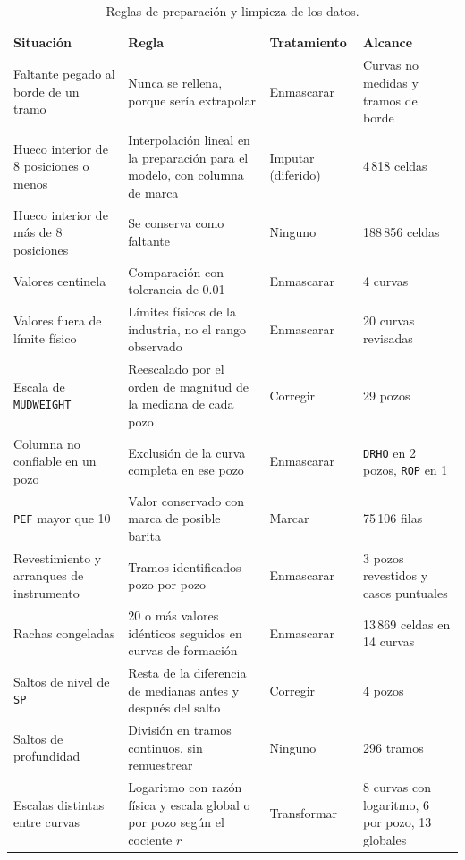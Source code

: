 \documentclass[11pt,a4paper]{article}
\begin{document}
\begin{table}[htbp]
\centering
\small
\caption{Reglas de preparación y limpieza de los datos.}
\label{tab:limpieza}
\begin{tabular}{p{3.4cm}p{4.9cm}p{2.2cm}p{3.3cm}}
\toprule
\textbf{Situación} & \textbf{Regla} & \textbf{Tratamiento} & \textbf{Alcance} \\
\midrule
Faltante pegado al borde de un tramo & Nunca se rellena, porque sería extrapolar & Enmascarar & Curvas no medidas y tramos de borde \\
Hueco interior de 8 posiciones o menos & Interpolación lineal en la preparación para el modelo, con columna de marca & Imputar (diferido) & 4\,818 celdas \\
Hueco interior de más de 8 posiciones & Se conserva como faltante & Ninguno & 188\,856 celdas \\
Valores centinela & Comparación con tolerancia de 0.01 & Enmascarar & 4 curvas \\
Valores fuera de límite físico & Límites físicos de la industria, no el rango observado & Enmascarar & 20 curvas revisadas \\
Escala de \texttt{MUDWEIGHT} & Reescalado por el orden de magnitud de la mediana de cada pozo & Corregir & 29 pozos \\
Columna no confiable en un pozo & Exclusión de la curva completa en ese pozo & Enmascarar & \texttt{DRHO} en 2 pozos, \texttt{ROP} en 1 \\
\texttt{PEF} mayor que 10 & Valor conservado con marca de posible barita & Marcar & 75\,106 filas \\
Revestimiento y arranques de instrumento & Tramos identificados pozo por pozo & Enmascarar & 3 pozos revestidos y casos puntuales \\
Rachas congeladas & 20 o más valores idénticos seguidos en curvas de formación & Enmascarar & 13\,869 celdas en 14 curvas \\
Saltos de nivel de \texttt{SP} & Resta de la diferencia de medianas antes y después del salto & Corregir & 4 pozos \\
Saltos de profundidad & División en tramos continuos, sin remuestrear & Ninguno & 296 tramos \\
Escalas distintas entre curvas & Logaritmo con razón física y escala global o por pozo según el cociente $r$ & Transformar & 8 curvas con logaritmo, 6 por pozo, 13 globales \\
\bottomrule
\end{tabular}
\end{table}
\end{document}

